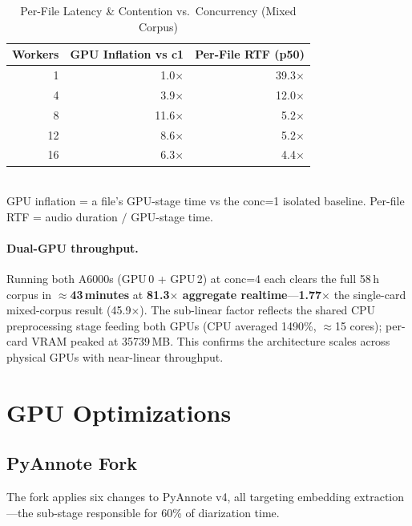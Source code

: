 \documentclass[conference,10pt]{IEEEtran}
\begin{document}
\begin{table}[!t]
\centering
\caption{Per-File Latency \& Contention vs.\ Concurrency (Mixed Corpus)}
\label{tab:latency}
\begin{tabular}{@{}rrr@{}}
\toprule
\textbf{Workers} & \textbf{GPU Inflation vs c1} & \textbf{Per-File RTF (p50)} \\
\midrule
1  & 1.0$\times$  & 39.3$\times$ \\
4  & 3.9$\times$  & 12.0$\times$ \\
8  & 11.6$\times$ & 5.2$\times$  \\
12 & 8.6$\times$  & 5.2$\times$  \\
16 & 6.3$\times$  & 4.4$\times$  \\
\bottomrule
\end{tabular}
\\[4pt]
{\footnotesize GPU inflation = a file's GPU-stage time vs the conc=1 isolated baseline.
  Per-file RTF = audio duration $/$ GPU-stage time.}
\end{table}

\paragraph{Dual-GPU throughput.}
Running both A6000s (GPU\,0 + GPU\,2) at conc=4 each clears the full 58\,h corpus in
\textbf{$\approx$43\,minutes} at \textbf{81.3$\times$ aggregate realtime}---\textbf{1.77$\times$}
the single-card mixed-corpus result (45.9$\times$). The sub-linear factor reflects the shared
CPU preprocessing stage feeding both GPUs (CPU averaged 1490\%, $\approx$15 cores); per-card
VRAM peaked at \num{35739}\,MB. This confirms the architecture scales across physical GPUs
with near-linear throughput.

\section{GPU Optimizations}
\label{sec:optimizations}

\subsection{PyAnnote Fork}

The fork applies six changes to PyAnnote v4, all targeting embedding
extraction---the sub-stage responsible for 60\% of diarization time.
\end{document}
